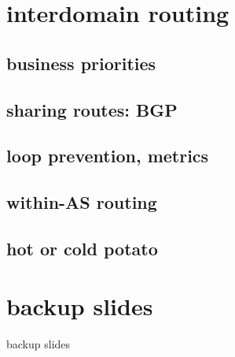 \section{interdomain routing}

\subsection{business priorities}

\subsection{sharing routes: BGP}

\subsection{loop prevention, metrics}

\subsection{within-AS routing}

\subsection{hot or cold potato}

\section{backup slides}
\begin{frame}{backup slides}
\end{frame}


